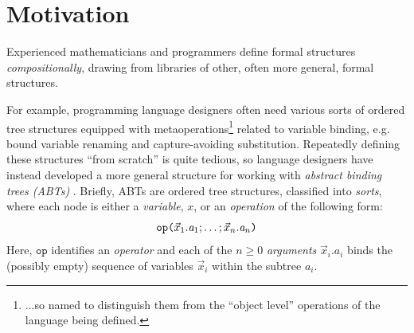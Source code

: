 \section{Motivation}\label{sec:intro-motivation}

Experienced mathematicians and programmers define formal structures \emph{compositionally}, drawing from libraries of other, often more general, formal structures. %

For example, programming language designers often need various sorts of ordered tree structures equipped with metaoperations\footnote{...so named to distinguish them from the ``object level'' operations of the language being defined.} related to variable binding, e.g. bound variable renaming and capture-avoiding substitution. Repeatedly defining these structures ``from scratch'' is quite tedious, so language designers have instead developed  a more general structure for working with \emph{abstract binding trees (ABTs)} \cite{Aczel78,pfpl}. Briefly, ABTs are ordered tree structures, classified into \emph{sorts}, where each node is either a \emph{variable}, $x$, or an \emph{operation} of the following form:
\begin{equation*}
\texttt{op}\texttt{(}\vec{x}_1.\mathit{a}_1; \ldots; \vec{x}_n.\mathit{a}_n\texttt{)}
\end{equation*} 
Here, $\texttt{op}$ identifies an \emph{operator} and each of the $n \geq 0$ \emph{arguments} $\vec{x}_i.\mathit{a}_i$ binds the (possibly empty) sequence of variables $\vec{x}_i$ within the subtree $a_i$. 

